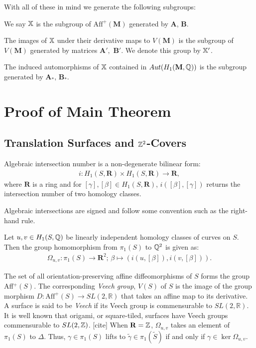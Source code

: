 \documentclass[]{article}
\def\bM{\mathbf{M}}
\begin{document}
With all of these in mind we generate the following subgroups:

\begin{Def}
We say $\mathbb{X}$ is the subgroup of $\text{Aff}^+(\bM)$ generated by $\mathbf{A}$, $\mathbf{B}$.
\end{Def}

\begin{Def}
The images of $\mathbb{X}$ under their derivative maps to $V(\bM)$ is the subgroup of $V(\bM)$ generated by matrices $\mathbf{A}',$ $\mathbf{B}'$. We denote this group by $\mathbb{X}'$.
\end{Def}

\begin{Def}
The induced automorphisms of $\mathbb{X}$ contained in $Aut(H_1(\bM,\QQ))$ is the subgroup generated by $\mathbf{A}_*$, $\mathbf{B}_*$.
\end{Def}
\section{Proof of Main Theorem}

\subsection{Translation Surfaces and $\mathbb{Z}^2$-Covers}


\begin{Def}
Algebraic intersection number is a non-degenerate bilinear form:
\begin{align*}
i:H_1(S,\mathbf{R})\times H_1(S,\mathbf{R})\rightarrow\mathbf{R},
\end{align*}
where $\mathbf{R}$ is a ring and for $[\gamma],[\beta]\in H_1(S,\mathbf{R})$, $i([\beta],[\gamma])$ returns the intersection number of two homology classes.
\end{Def}
Algebraic intersections are signed and follow some convention such as the right-hand rule.

\begin{Def}
Let $u,v\in H_1(S,\mathbb{Q})$ be linearly independent homology classes of curves on $S$. Then the group homomorphism from $\pi_1(S)$ to $\mathbb{Q}^2$ is given as:
\begin{align*}
\Omega_{u,v}:\pi_1(S)\rightarrow \mathbf{R}^2 \text{; } \beta\mapsto(i(u,[\beta]),i(v,[\beta])).
\end{align*}
\end{Def}



The set of all orientation-preserving affine diffeomorphisms of $S$ forms the group Aff$^+(S)$. The corresponding \emph{Veech group}, $V(S)$ of $S$ is the image of the group morphism $D:\text{Aff}^+(S)\rightarrow SL(2,\mathbb{R})$ that takes an affine map to its derivative. A surface is said to be \emph{Veech} if its Veech group is commensurable to $SL(2,\mathbb{R})$. It is well known that origami, or square-tiled, surfaces have Veech groups commensurable to $SL(2,\mathbb{Z})$. [cite] When $\mathbf{R}=\mathbb{Z}$, $\Omega_{u,v}$ takes an element of $\pi_1(S)$ to $\Delta$. Thus, $\gamma\in\pi_1(S)$ lifts to $\tilde{\gamma}\in\pi_1(\tilde{S})$ if and only if $\gamma\in\ker\Omega_{u,v}$.
\end{document}

